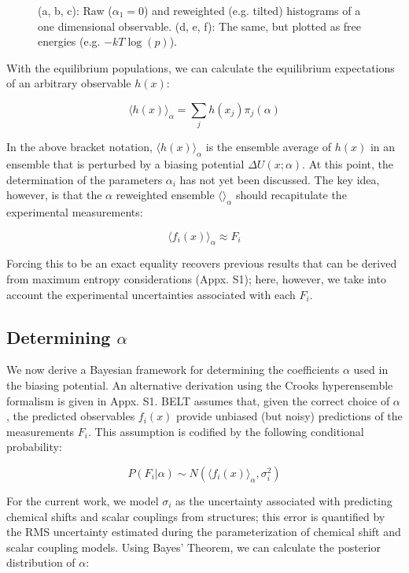 \documentclass[11pt,titlepage]{article}
\begin{document}
\begin{figure}
\caption{
(a, b, c): Raw ($\alpha_1 = 0$) and reweighted (e.g. tilted) histograms of a one dimensional observable.  (d, e, f): The same, but plotted as free energies (e.g. $-kT \log(p)$).  
}
\label{figure:Hist}
\end{figure}

With the equilibrium populations, we can calculate the equilibrium expectations of an arbitrary observable $h(x)$:

$$\langle h(x)\rangle _\alpha = \sum_j h(x_j) \pi_j(\alpha)$$

In the above bracket notation, $\langle h(x)\rangle _\alpha$ is the ensemble average of $h(x)$ in an ensemble that is perturbed by a biasing potential $\Delta U(x;\alpha)$.  At this point, the determination of the parameters $\alpha_i$ has not yet been discussed.  The key idea, however, is that the $\alpha$ reweighted ensemble $\langle \rangle _\alpha$ should recapitulate the experimental measurements:

$$\langle f_i(x)\rangle _\alpha \approx F_i$$

Forcing this to be an exact equality recovers previous results \citep{chodera2012} that can be derived from maximum entropy considerations (Appx. S1); here, however, we take into account the experimental uncertainties associated with each $F_i$.  

\subsection*{Determining $\alpha$}

We now derive a Bayesian framework for determining the coefficients $\alpha$ used in the biasing potential.  An alternative derivation using the Crooks hyperensemble formalism \cite{crooks2007beyond} is given in Appx. S1.  BELT assumes that, given the correct choice of $\alpha$, the predicted observables $f_i(x)$ provide unbiased (but noisy) predictions of the measurements $F_i$.  This assumption is codified by the following conditional probability:

$$P(F_i | \alpha) \sim N(\langle f_i(x)\rangle _\alpha, \sigma_i^2)$$

For the current work, we model $\sigma_i$ as the uncertainty associated with predicting chemical shifts and scalar couplings from structures; this error is quantified by the RMS uncertainty estimated during the parameterization of chemical shift and scalar coupling models.  Using Bayes' Theorem, we can calculate the posterior distribution of $\alpha$:
\end{document}
